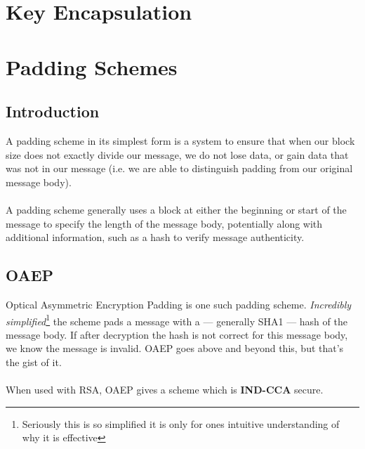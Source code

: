 \section{Key Encapsulation}

\section{Padding Schemes}

	\subsection{Introduction}
		A padding scheme in its simplest form is a system to ensure that when our block size does not exactly divide our message, we do not lose data, or gain data that was not in our message (i.e. we are able to distinguish padding from our original message body).\\
		\\
		A padding scheme generally uses a block at either the beginning or start of the message to specify the length of the message body, potentially along with additional information, such as a hash to verify message authenticity.

	\subsection{OAEP}
		Optical Asymmetric Encryption Padding is one such padding scheme. \textit{Incredibly simplified}\footnote{Seriously this is so simplified it is only for ones intuitive understanding of why it is effective} the scheme pads a message with a --- generally SHA1 --- hash of the message body. If after decryption the hash is not correct for this message body, we know the message is invalid. OAEP goes above and beyond this, but that's the gist of it.\\
		\\
		When used with RSA, OAEP gives a scheme which is \textbf{IND-CCA} secure.


